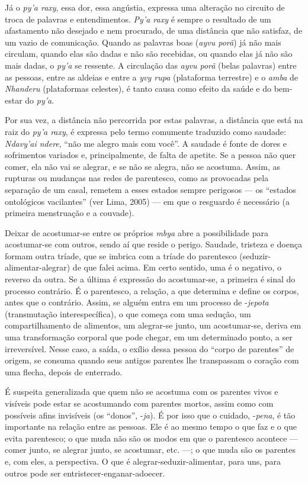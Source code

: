Já o \emph{py’a raxy}, essa dor, essa angústia, expressa uma alteração no
circuito de troca de palavras e entendimentos. \emph{Py’a raxy} é sempre o
resultado de um afastamento não desejado e nem procurado, de uma
distância que não satisfaz, de um vazio de comunicação. Quando as
palavras boas (\emph{ayvu porã}) já não mais circulam, quando elas são dadas e
não são recebidas, ou quando elas já não são mais dadas, o \emph{py’a} se
ressente. A circulação das \emph{ayvu porã} (belas palavras) entre as pessoas,
entre as aldeias e entre a \emph{yvy rupa} (plataforma terrestre) e o \emph{amba} de
\emph{Nhanderu} (plataformas celestes), é tanto causa como efeito da saúde e
do bem-estar do \emph{py’a}.

Por sua vez, a distância não percorrida por estas palavras, a distância
que está na raiz do \emph{py’a raxy}, é expressa pelo termo comumente
traduzido como saudade: \emph{Ndavy’ai ndere}, ``não me alegro mais com
você''. A saudade é fonte de dores e sofrimentos variados e,
principalmente, de falta de apetite. Se a pessoa não quer comer, ela
não vai se alegrar, e se não se alegra, não se acostuma. Assim, as
rupturas ou mudanças nas redes de parentesco, como as provocadas pela
separação de um casal, remetem a esses estados sempre perigosos --- os
``estados ontológicos vacilantes'' (ver Lima, 2005) --- em que o resguardo
é necessário (a primeira menstruação e a couvade). 

Deixar de acostumar-se entre os próprios \emph{mbya} abre a possibilidade para
acostumar-se com outros, sendo aí que reside o perigo. Saudade,
tristeza e doença formam outra tríade, que se imbrica com a tríade do
parentesco (seduzir-alimentar-alegrar) de que falei acima. Em certo
sentido, uma é o negativo, o reverso da outra. Se a última é expressão
do acostumar-se, a primeira é sinal do processo contrário. É o
parentesco, a relação, a que determina e define os corpos, antes que o
contrário. Assim, se alguém entra em um processo de -\emph{jepota}
(transmutação interespecífica), o que começa com uma sedução, um
compartilhamento de alimentos, um alegrar-se junto, um acostumar-se,
deriva em uma transformação corporal que pode chegar, em um determinado
ponto, a ser irreversível. Nesse caso, a saída, o exílio dessa pessoa
do ``corpo de parentes'' de origem, se consuma quando seus antigos
parentes lhe transpassam o coração com uma flecha, depois de
enterrado. 

É suspeita generalizada que quem não se acostuma com os parentes vivos e
visíveis pode estar se acostumando com parentes mortos, assim como com
possíveis afins invisíveis (os ``donos'', -\emph{ja}). É por isso que o cuidado,
-\emph{pena}, é tão importante na relação entre as pessoas. Ele é ao mesmo
tempo o que faz e o que evita parentesco; o que muda não são os modos
em que o parentesco acontece --- comer junto, se alegrar junto, se
acostumar, etc. ---; o que muda são os parentes e, com eles, a
perspectiva. O que é alegrar-seduzir-alimentar, para uns, para outros
pode ser entristecer-enganar-adoecer. 

